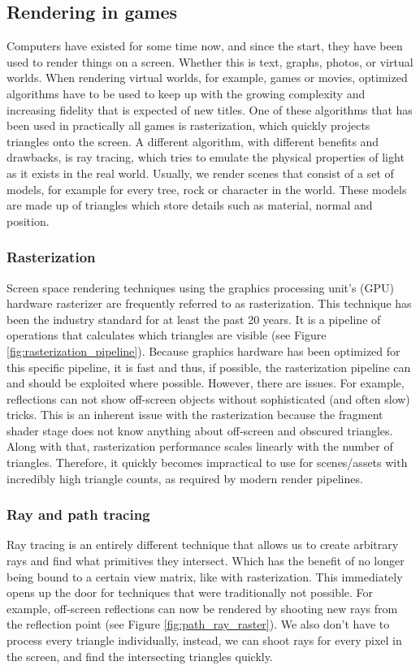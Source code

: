 \subsection{Rendering in games} \label{related_work:rendering}
Computers have existed for some time now, and since the start, they have been used to render things on a screen. Whether this is text, graphs, photos, or virtual worlds. When rendering virtual worlds, for example, games or movies, optimized algorithms have to be used to keep up with the growing complexity and increasing fidelity that is expected of new titles. One of these algorithms that has been used in practically all games is rasterization, which quickly projects triangles onto the screen. A different algorithm, with different benefits and drawbacks, is ray tracing, which tries to emulate the physical properties of light as it exists in the real world. Usually, we render scenes that consist of a set of models, for example for every tree, rock or character in the world. These models are made up of triangles which store details such as material, normal and position.


\subsubsection{Rasterization} \label{related_work:rendering:rasterization}
Screen space rendering techniques using the graphics processing unit's (GPU) hardware rasterizer are frequently referred to as rasterization. This technique has been the industry standard for at least the past 20 years. It is a pipeline of operations that calculates which triangles are visible (see Figure \ref{fig:rasterization_pipeline}). Because graphics hardware has been optimized for this specific pipeline, it is fast and thus, if possible, the rasterization pipeline can and should be exploited where possible. However, there are issues. For example, reflections can not show off-screen objects without sophisticated (and often slow) tricks. This is an inherent issue with the rasterization because the fragment shader stage does not know anything about off-screen and obscured triangles. Along with that, rasterization performance scales linearly with the number of triangles. Therefore, it quickly becomes impractical to use for scenes/assets with incredibly high triangle counts, as required by modern render pipelines.

\subsubsection{Ray and path tracing} \label{related_work:rendering:ray_tracing}
Ray tracing is an entirely different technique that allows us to create arbitrary rays and find what primitives they intersect. Which has the benefit of no longer being bound to a certain view matrix, like with rasterization. This immediately opens up the door for techniques that were traditionally not possible. For example, off-screen reflections can now be rendered by shooting new rays from the reflection point (see Figure \ref{fig:path_ray_raster}). We also don't have to process every triangle individually, instead, we can shoot rays for every pixel in the screen, and find the intersecting triangles quickly.

